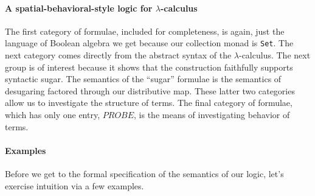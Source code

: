 \paragraph{A spatial-behavioral-style logic for $\lambda$-calculus}


The first category of formulae, included for completeness, is again,
just the language of Boolean algebra we get because our collection
monad is \lstinline[language=Scala,mathescape=true]!Set!. The next
category comes directly from the abstract syntax of the
$\lambda$-calculus. The next group is of interest because it shows
that the construction faithfully supports syntactic sugar. The
semantics of the ``sugar'' formulae is the semantics of desugaring
factored through our distributive map. These latter two categories
allow us to investigate the structure of terms. The final category of
formulae, which has only one entry, $PROBE$, is the means of
investigating behavior of terms.

\paragraph{Examples}
Before we get to the formal specification of the semantics of our
logic, let's exercise intuition via a few examples.

